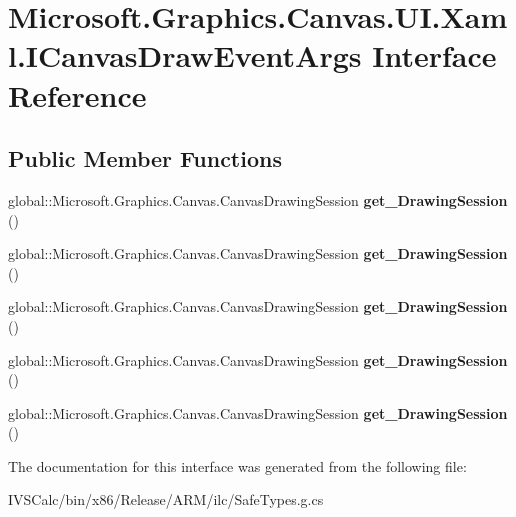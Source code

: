 \hypertarget{interface_microsoft_1_1_graphics_1_1_canvas_1_1_u_i_1_1_xaml_1_1_i_canvas_draw_event_args}{}\section{Microsoft.\+Graphics.\+Canvas.\+U\+I.\+Xaml.\+I\+Canvas\+Draw\+Event\+Args Interface Reference}
\label{interface_microsoft_1_1_graphics_1_1_canvas_1_1_u_i_1_1_xaml_1_1_i_canvas_draw_event_args}
\subsection*{Public Member Functions}
\begin{DoxyCompactItemize}
\item 
\mbox{\label{interface_microsoft_1_1_graphics_1_1_canvas_1_1_u_i_1_1_xaml_1_1_i_canvas_draw_event_args_af0762dd6a6a06efeb54efa4e416a7284}} 
global\+::\+Microsoft.\+Graphics.\+Canvas.\+Canvas\+Drawing\+Session {\bfseries get\+\_\+\+Drawing\+Session} ()
\item 
\mbox{\label{interface_microsoft_1_1_graphics_1_1_canvas_1_1_u_i_1_1_xaml_1_1_i_canvas_draw_event_args_af0762dd6a6a06efeb54efa4e416a7284}} 
global\+::\+Microsoft.\+Graphics.\+Canvas.\+Canvas\+Drawing\+Session {\bfseries get\+\_\+\+Drawing\+Session} ()
\item 
\mbox{\label{interface_microsoft_1_1_graphics_1_1_canvas_1_1_u_i_1_1_xaml_1_1_i_canvas_draw_event_args_af0762dd6a6a06efeb54efa4e416a7284}} 
global\+::\+Microsoft.\+Graphics.\+Canvas.\+Canvas\+Drawing\+Session {\bfseries get\+\_\+\+Drawing\+Session} ()
\item 
\mbox{\label{interface_microsoft_1_1_graphics_1_1_canvas_1_1_u_i_1_1_xaml_1_1_i_canvas_draw_event_args_af0762dd6a6a06efeb54efa4e416a7284}} 
global\+::\+Microsoft.\+Graphics.\+Canvas.\+Canvas\+Drawing\+Session {\bfseries get\+\_\+\+Drawing\+Session} ()
\item 
\mbox{\label{interface_microsoft_1_1_graphics_1_1_canvas_1_1_u_i_1_1_xaml_1_1_i_canvas_draw_event_args_af0762dd6a6a06efeb54efa4e416a7284}} 
global\+::\+Microsoft.\+Graphics.\+Canvas.\+Canvas\+Drawing\+Session {\bfseries get\+\_\+\+Drawing\+Session} ()
\end{DoxyCompactItemize}


The documentation for this interface was generated from the following file\+:\begin{DoxyCompactItemize}
\item 
I\+V\+S\+Calc/bin/x86/\+Release/\+A\+R\+M/ilc/Safe\+Types.\+g.\+cs\end{DoxyCompactItemize}
